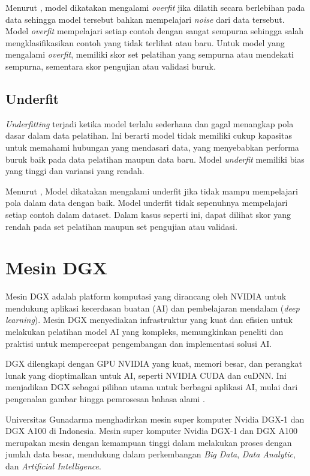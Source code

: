 Menurut \cite{Desai2019}, model dikatakan mengalami \textit{overfit} jika dilatih secara berlebihan pada data sehingga model tersebut bahkan mempelajari \textit{noise} dari data tersebut. Model \textit{overfit} mempelajari setiap contoh dengan sangat sempurna sehingga salah mengklasifikasikan contoh yang tidak terlihat atau baru. Untuk model yang mengalami \textit{overfit}, memiliki skor set pelatihan yang sempurna atau mendekati sempurna, sementara skor pengujian atau validasi buruk.

\subsection{Underfit}
\textit{Underfitting} terjadi ketika model terlalu sederhana dan gagal menangkap pola dasar dalam data pelatihan. Ini berarti model tidak memiliki cukup kapasitas untuk memahami hubungan yang mendasari data, yang menyebabkan performa buruk baik pada data pelatihan maupun data baru. Model \textit{underfit} memiliki bias yang tinggi dan variansi yang rendah. \cite{Goodfellow-et-al-2016}

Menurut \cite{Desai2019}, Model dikatakan mengalami underfit jika tidak mampu mempelajari pola dalam data dengan baik. Model underfit tidak sepenuhnya mempelajari setiap contoh dalam dataset. Dalam kasus seperti ini, dapat dilihat skor yang rendah pada set pelatihan maupun set pengujian atau validasi.

\section{Mesin DGX}
Mesin DGX adalah platform komputasi yang dirancang oleh NVIDIA untuk mendukung aplikasi kecerdasan buatan (AI) dan pembelajaran mendalam (\textit{deep learning}). Mesin DGX menyediakan infrastruktur yang kuat dan efisien untuk melakukan pelatihan model AI yang kompleks, memungkinkan peneliti dan praktisi untuk mempercepat pengembangan dan implementasi solusi AI.

DGX dilengkapi dengan GPU NVIDIA yang kuat, memori besar, dan perangkat lunak yang dioptimalkan untuk AI, seperti NVIDIA CUDA dan cuDNN. Ini menjadikan DGX sebagai pilihan utama untuk berbagai aplikasi AI, mulai dari pengenalan gambar hingga pemrosesan bahasa alami \cite{NVIDIA2021}.

Universitas Gunadarma menghadirkan mesin super komputer Nvidia DGX-1 dan DGX A100 di Indonesia. Mesin super komputer Nvidia DGX-1 dan DGX A100 merupakan mesin dengan kemampuan tinggi dalam melakukan proses dengan jumlah data besar, mendukung dalam perkembangan \textit{Big Data}, \textit{Data Analytic}, dan \textit{Artificial Intelligence}. 

